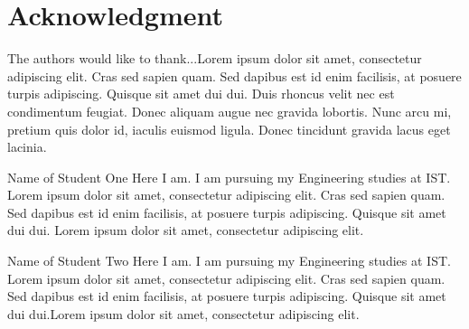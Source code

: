 \documentclass[a4paper,12pt,journal,twoside,compsoc]{PPIEEEtran}
\begin{document}
  \section*{} %
\else
  \section*{Acknowledgment}
\fi

The authors would like to thank...Lorem ipsum dolor sit amet, consectetur adipiscing elit. Cras sed sapien quam. Sed dapibus est id enim facilisis, at posuere turpis adipiscing. Quisque sit amet dui dui.
Duis rhoncus velit nec est condimentum feugiat. Donec aliquam augue nec gravida lobortis. Nunc arcu mi, pretium quis dolor id, iaculis euismod ligula. Donec tincidunt gravida lacus eget lacinia.

%

% 
\begin{IEEEbiography}{Name of Student One}
Here I am. I am pursuing my Engineering studies at \ac{IST}. Lorem ipsum dolor sit amet, consectetur adipiscing elit. Cras sed sapien quam. Sed dapibus est id enim facilisis, at posuere turpis adipiscing. Quisque sit amet dui dui. Lorem ipsum dolor sit amet, consectetur adipiscing elit. 
\end{IEEEbiography}
\begin{IEEEbiography}
{Name of Student Two}
Here I am. I am pursuing my Engineering studies at \ac{IST}. Lorem ipsum dolor sit amet, consectetur adipiscing elit. Cras sed sapien quam. Sed dapibus est id enim facilisis, at posuere turpis adipiscing. Quisque sit amet dui dui.Lorem ipsum dolor sit amet, consectetur adipiscing elit. 
\end{IEEEbiography}
\end{document}
